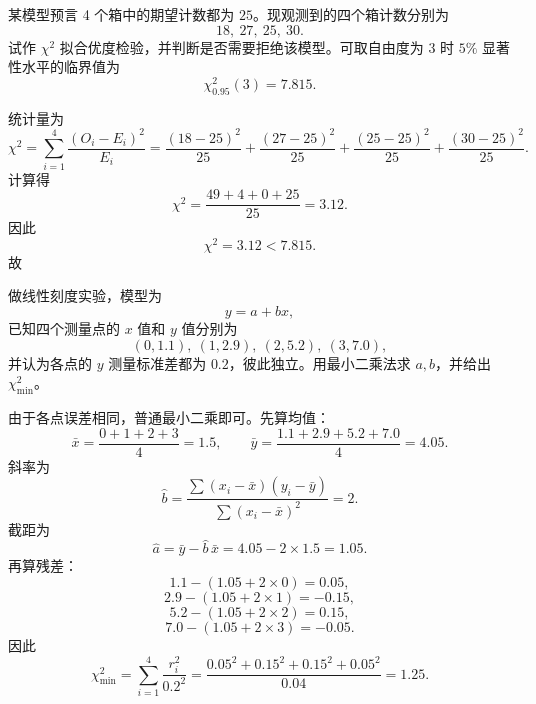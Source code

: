 \begin{question}
某模型预言 4 个箱中的期望计数都为 $25$。现观测到的四个箱计数分别为
\[
18,\ 27,\ 25,\ 30.
\]
试作 $\chi^2$ 拟合优度检验，并判断是否需要拒绝该模型。可取自由度为 $3$ 时 $5\%$ 显著性水平的临界值为
\[
\chi^2_{0.95}(3)=7.815.
\]
\begin{solution}
统计量为
\[
\chi^2=\sum_{i=1}^4 \frac{(O_i-E_i)^2}{E_i}
=\frac{(18-25)^2}{25}+\frac{(27-25)^2}{25}
+\frac{(25-25)^2}{25}+\frac{(30-25)^2}{25}.
\]
计算得
\[
\chi^2=\frac{49+4+0+25}{25}=3.12.
\]
因此
\[
\chi^2=3.12<7.815.
\]
故
\end{solution}
\end{question}

\begin{question}
做线性刻度实验，模型为
\[
y=a+bx,
\]
已知四个测量点的 $x$ 值和 $y$ 值分别为
\[
(0,1.1),\ (1,2.9),\ (2,5.2),\ (3,7.0),
\]
并认为各点的 $y$ 测量标准差都为 $0.2$，彼此独立。用最小二乘法求 $a,b$，并给出 $\chi^2_{\min}$。
\begin{solution}
由于各点误差相同，普通最小二乘即可。先算均值：
\[
\bar x=\frac{0+1+2+3}{4}=1.5,\qquad
\bar y=\frac{1.1+2.9+5.2+7.0}{4}=4.05.
\]
斜率为
\[
\hat b=\frac{\sum (x_i-\bar x)(y_i-\bar y)}{\sum (x_i-\bar x)^2}=2.
\]
截距为
\[
\hat a=\bar y-\hat b\,\bar x=4.05-2\times 1.5=1.05.
\]
再算残差：
\[
1.1-(1.05+2\times 0)=0.05,
\]
\[
2.9-(1.05+2\times 1)=-0.15,
\]
\[
5.2-(1.05+2\times 2)=0.15,
\]
\[
7.0-(1.05+2\times 3)=-0.05.
\]
因此
\[
\chi^2_{\min}
=\sum_{i=1}^4\frac{r_i^2}{0.2^2}
=\frac{0.05^2+0.15^2+0.15^2+0.05^2}{0.04}
=1.25.
\]
\end{solution}
\end{question}

